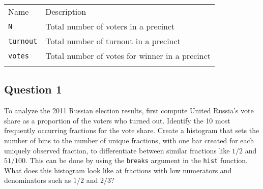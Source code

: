 \documentclass[]{article}
\begin{document}
\begin{longtable}[c]{@{}ll@{}}
\toprule\addlinespace
\begin{minipage}[b]{0.26\columnwidth}\raggedright
Name
\end{minipage} & \begin{minipage}[b]{0.60\columnwidth}\raggedright
Description
\end{minipage}
\\\addlinespace
\midrule\endhead
\begin{minipage}[t]{0.26\columnwidth}\raggedright
\texttt{N}
\end{minipage} & \begin{minipage}[t]{0.60\columnwidth}\raggedright
Total number of voters in a precinct
\end{minipage}
\\\addlinespace
\begin{minipage}[t]{0.26\columnwidth}\raggedright
\texttt{turnout}
\end{minipage} & \begin{minipage}[t]{0.60\columnwidth}\raggedright
Total number of turnout in a precinct
\end{minipage}
\\\addlinespace
\begin{minipage}[t]{0.26\columnwidth}\raggedright
\texttt{votes}
\end{minipage} & \begin{minipage}[t]{0.60\columnwidth}\raggedright
Total number of votes for winner in a precinct
\end{minipage}
\\\addlinespace
\bottomrule
\end{longtable}

\subsection{Question 1}\label{question-1}

To analyze the 2011 Russian election results, first compute United
Russia's vote share as a proportion of the voters who turned out.
Identify the 10 most frequently occurring fractions for the vote share.
Create a histogram that sets the number of bins to the number of unique
fractions, with one bar created for each uniquely observed fraction, to
differentiate between similar fractions like $1/2$ and $51/100$. This
can be done by using the \texttt{breaks} argument in the \texttt{hist}
function. What does this histogram look like at fractions with low
numerators and denominators such as $1/2$ and $2/3$?
\end{document}
